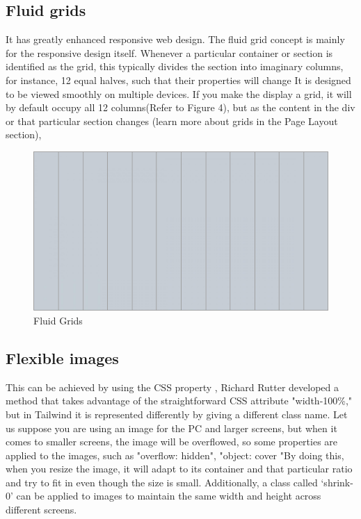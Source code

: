 \documentclass[conference]{IEEEtran}
\begin{document}
\subsection{Fluid grids}

It has greatly enhanced responsive web design. The fluid grid concept is mainly for the responsive design itself. Whenever a particular container or section is identified as the grid, this typically divides the section into imaginary columns, for instance, 12 equal halves, such that their properties will change It is designed to be viewed smoothly on multiple devices. If you make the display a grid, it will by default occupy all 12 columns(Refer to Figure 4), but as the content in the div or that particular section changes (learn more about grids in the Page Layout section),

\begin{figure}
    \centering
    \includegraphics[width=1\linewidth]{Untitled drawing-4.png}
    \caption{Fluid Grids}
    \label{fig:enter-label}
\end{figure}

\subsection{Flexible images}

This can be achieved by using the CSS property , Richard Rutter developed a method that takes advantage of the straightforward CSS attribute "width-100\%," but in Tailwind it is represented differently by giving a different class name. Let us suppose you are using an image for the PC and larger screens, but when it comes to smaller screens, the image will be overflowed, so some properties are applied to the images, such as "overflow: hidden", 
"object: cover "By doing this, when you resize the image, it will adapt to its container and that particular ratio and try to fit in even though the size is small. Additionally, a class called `shrink-0' can be applied to images to maintain the same width and height across different screens.
\end{document}
